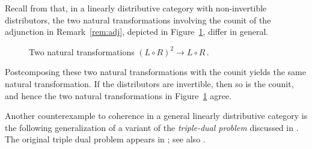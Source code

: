 \documentclass[reqno,12pt]{amsart}
\begin{document}
\begin{example}\label{ex:DRS counterexample}
	Recall from \cite[Ex.~5.9]{DRS26} that, in a linearly distributive category with non-invertible distributors, the two natural transformations involving the counit of the adjunction in Remark~\ref{rem:adj}, depicted in Figure~\ref{fig:capcap}, differ in general.
	
	\begin{figure}[H]
		\centering
		\caption{Two natural transformations $(L\circ R)^2\to L \circ R$\,.}
		\label{fig:capcap}
	\end{figure}
	Postcomposing these two natural transformations with the counit yields the same natural transformation. If the distributors are invertible, then so is the counit, and hence the two natural transformations in Figure~\ref{fig:capcap} agree.
\end{example} 

Another counterexample to coherence in a general linearly distributive category is the following generalization of a variant of the \emph{triple-dual problem} discussed in \cite[Ex.~4.2]{BCST96}. The original triple dual problem appears in \cite[Diag.~(1.4)]{KeMac71}; see also \cite{Hu12,DuVi19}.
\end{document}
